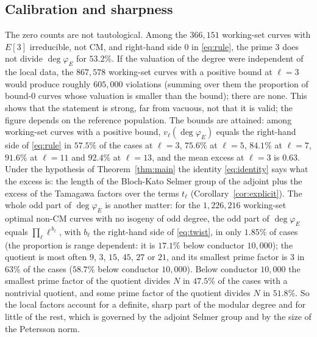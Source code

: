 \documentclass[11pt]{amsart}
\theoremstyle{definition}
\newcommand{\degphi}{\deg\varphi_E}
\begin{document}
\subsection{Calibration and sharpness}\label{sec:sharp}
The zero counts are not tautological. Among the $366{,}151$ working-set curves with $E[3]$ irreducible, not CM, and right-hand side $0$ in \eqref{eq:rule}, the prime $3$ does not divide $\degphi$ for $53.2\%$. If the valuation of the degree were independent of the local data, the $867{,}578$ working-set curves with a positive bound at $\ell=3$ would produce roughly $605{,}000$ violations (summing over them the proportion of bound-$0$ curves whose valuation is smaller than the bound); there are none. This shows that the statement is strong, far from vacuous, not that it is valid; the figure depends on the reference population. The bounds are attained: among working-set curves with a positive bound, $v_\ell(\degphi)$ equals the right-hand side of \eqref{eq:rule} in $57.5\%$ of the cases at $\ell=3$, $75.6\%$ at $\ell=5$, $84.1\%$ at $\ell=7$, $91.6\%$ at $\ell=11$ and $92.4\%$ at $\ell=13$, and the mean excess at $\ell=3$ is $0.63$. Under the hypothesis of Theorem~\ref{thm:main} the identity \eqref{eq:identity} says what the excess is: the length of the Bloch-Kato Selmer group of the adjoint plus the excess of the Tamagawa factors over the terms $t_\ell$ (Corollary~\ref{cor:explicit}). The whole odd part of $\degphi$ is another matter: for the $1{,}226{,}216$ working-set optimal non-CM curves with no isogeny of odd degree, the odd part of $\degphi$ equals $\prod_\ell\ell^{\,b_\ell}$, with $b_\ell$ the right-hand side of \eqref{eq:twist}, in only $1.85\%$ of cases (the proportion is range dependent: it is $17.1\%$ below conductor $10{,}000$); the quotient is most often $9$, $3$, $15$, $45$, $27$ or $21$, and its smallest prime factor is $3$ in $63\%$ of the cases ($58.7\%$ below conductor $10{,}000$). Below conductor $10{,}000$ the smallest prime factor of the quotient divides $N$ in $47.5\%$ of the cases with a nontrivial quotient, and some prime factor of the quotient divides $N$ in $51.8\%$. So the local factors account for a definite, sharp part of the modular degree and for little of the rest, which is governed by the adjoint Selmer group and by the size of the Petersson norm.
\end{document}
